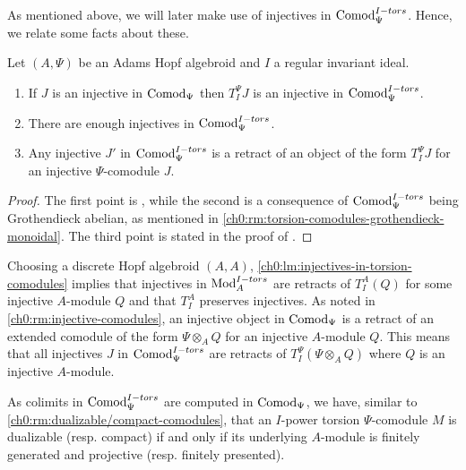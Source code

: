 As mentioned above, we will later make use of injectives in $\mathrm{Comod}_\Psi^{I-tors}$. Hence, we relate some facts about these. 

\begin{lemma}
    \label{ch0:lm:injectives-in-torsion-comodules}
    Let $(A, \Psi)$ be an Adams Hopf algebroid and $I$ a regular invariant ideal.
    \begin{enumerate}
        \item If $J$ is an injective in $\mathrm{Comod}_\Psi$ then $T_I^\Psi J$ is an injective in $\mathrm{Comod}_\Psi^{I-tors}$.
        \item There are enough injectives in $\mathrm{Comod}_\Psi^{I-tors}$.
        \item Any injective $J'$ in $\mathrm{Comod}_\Psi^{I-tors}$ is a retract of an object of the form $T_I^\Psi J$ for an injective $\Psi$-comodule $J$.
    \end{enumerate} 
\end{lemma}
\begin{proof}
    The first point is \cite[2.1.4]{brodmann-sharp_1998}, while the second is a consequence of $\mathrm{Comod}_\Psi^{I-tors}$ being Grothendieck abelian, as mentioned in \cref{ch0:rm:torsion-comodules-grothendieck-monoidal}. The third point is stated in the proof of \cite[3.16]{barthel-heard-valenzuela_2020}. 
\end{proof}

\begin{remark}
    \label{ch0:rm:injectives-in-torsion-modules}
    Choosing a discrete Hopf algebroid $(A,A)$, \cref{ch0:lm:injectives-in-torsion-comodules} implies that injectives in $\mathrm{Mod}_A^{I-tors}$ are retracts of $T_I^A(Q)$ for some injective $A$-module $Q$ and that $T_I^A$ preserves injectives. As noted in \cref{ch0:rm:injective-comodules}, an injective object in $\mathrm{Comod}_\Psi$ is a retract of an extended comodule of the form $\Psi\otimes_A Q$ for an injective $A$-module $Q$. This means that all injectives $J$ in $\mathrm{Comod}_\Psi^{I-tors}$ are retracts of $T_I^\Psi(\Psi\otimes_A Q)$ where $Q$ is an injective $A$-module. 
\end{remark}

\begin{remark}
    \label{ch0:rm:dualizable/compact-torsion-comodule}
    As colimits in $\mathrm{Comod}_\Psi^{I-tors}$ are computed in $\mathrm{Comod}_\Psi$, we have, similar to \cref{ch0:rm:dualizable/compact-comodules}, that an $I$-power torsion $\Psi$-comodule $M$ is dualizable (resp. compact) if and only if its underlying $A$-module is finitely generated and projective (resp. finitely presented). 
\end{remark}

